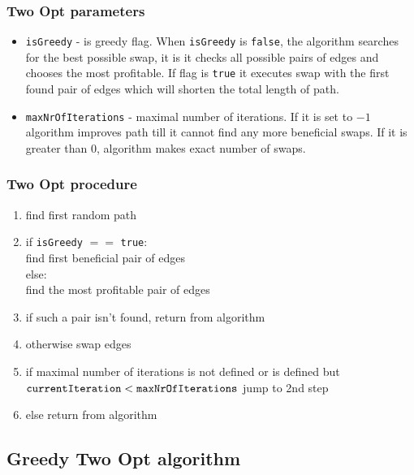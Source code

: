 \documentclass[titlepage]{article}
\begin{document}
\subsubsection{Two Opt parameters}

\begin{itemize}
	\item \texttt{isGreedy} - is greedy flag. When \texttt{isGreedy} is \texttt{false}, the algorithm searches for the best possible swap, it is it checks all possible pairs of edges and chooses the most profitable. If flag is \texttt{true} it executes swap with the first found pair of edges which will shorten the total length of path.
	
	\item \texttt{maxNrOfIterations} - maximal number of iterations. If it is set to $-1$ algorithm improves path till it cannot find any more beneficial swaps. If it is greater than $0$, algorithm makes exact number of swaps.	
\end{itemize}

\subsubsection{Two Opt procedure}

\begin{enumerate}
	\item find first random path
	\item if \texttt{isGreedy} $==$ \texttt{true}: \\
	\hspace*{5mm} find first beneficial pair of edges \\
	else:\\
	\hspace*{5mm} find the most profitable pair of edges
	\item if such a pair isn't found, return from algorithm
	\item otherwise swap edges
	\item if maximal number of iterations is not defined or is defined but $\mbox{\texttt{currentIteration}} < \mbox{\texttt{maxNrOfIterations}}$ jump to 2nd step
	\item else return from algorithm
\end{enumerate}


\subsection{Greedy Two Opt algorithm}
\end{document}
